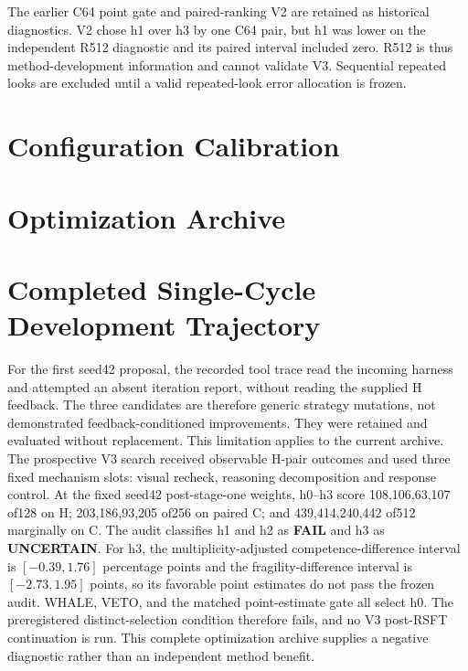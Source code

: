 \documentclass[10pt,twocolumn,letterpaper]{article}
\begin{document}
The earlier C64 point gate and paired-ranking V2 are retained as historical
diagnostics. V2 chose h1 over h3 by one C64 pair, but h1 was lower on the
independent R512 diagnostic and its paired interval included zero. R512 is thus
method-development information and cannot validate V3. Sequential repeated
looks are excluded until a valid repeated-look error allocation is frozen.
\section{Configuration Calibration}
\section{Optimization Archive}
\section{Completed Single-Cycle Development Trajectory}
For the first seed42 proposal, the recorded tool trace read the incoming
harness and attempted an absent iteration report, without reading the supplied
H feedback. The three candidates are therefore generic strategy mutations,
not demonstrated feedback-conditioned improvements. They were retained and
evaluated without replacement. This limitation applies to the current archive.
The prospective V3 search received observable H-pair outcomes and used
three fixed mechanism slots: visual recheck, reasoning decomposition and response
control.
At the fixed seed42 post-stage-one weights, h0--h3 score 108,106,63,107 of128
on H; 203,186,93,205 of256 on paired C; and 439,414,240,442 of512 marginally
on C. The audit classifies h1 and h2 as \textbf{FAIL} and h3 as
\textbf{UNCERTAIN}. For h3, the multiplicity-adjusted competence-difference
interval is $[-0.39,1.76]$ percentage points and the fragility-difference
interval is $[-2.73,1.95]$ points, so its favorable point estimates do not pass
the frozen audit. WHALE, VETO, and the matched point-estimate gate all select
h0. The preregistered distinct-selection condition therefore fails, and no V3
post-RSFT continuation is run. This complete optimization archive supplies a
negative diagnostic rather than an independent method benefit.
\end{document}
